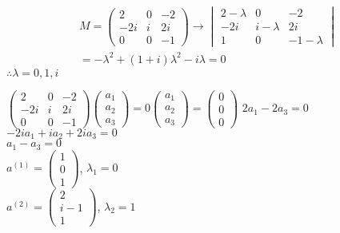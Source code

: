 \documentclass{article}
\begin{document}
\begin{multline*}
M=\begin{pmatrix}
2&0&-2\\
-2i&i&2i\\
0&0&-1
\end{pmatrix} \rightarrow \begin{vmatrix}
2-\lambda&0&-2\\
-2i&i-\lambda&2i\\
1&0&-1-\lambda
\end{vmatrix}\\
=-\lambda^{2}+(1+i)\lambda^{2}-i\lambda=0
\end{multline*}
$\therefore \lambda=0,1,i$
\newpage

$\begin{pmatrix}
2&0&-2\\
-2i&i&2i\\
0&0&-1
\end{pmatrix}\begin{pmatrix}
a_{1}\\
a_{2}\\
a_{3}
\end{pmatrix}=0\begin{pmatrix}
a_{1}\\
a_{2}\\
a_{3}
\end{pmatrix}=\begin{pmatrix}
0\\
0\\
0
\end{pmatrix}$
\vspace{1cm}
$2a_{1}-2a_{3}=0$\\

$-2ia_{1}+ia_{2}+2ia_{3}=0$\\

$a_{1}-a_{3}=0$\\

$a^(1)=\begin{pmatrix}
1\\
0\\
1
\end{pmatrix}$, \hspace{1cm} $\lambda_{1}=0$\\

$a^(2)=\begin{pmatrix}
2\\
i-1\\
1
\end{pmatrix}$, \hspace{1cm}$\lambda_{2}=1$\\
\end{document}
